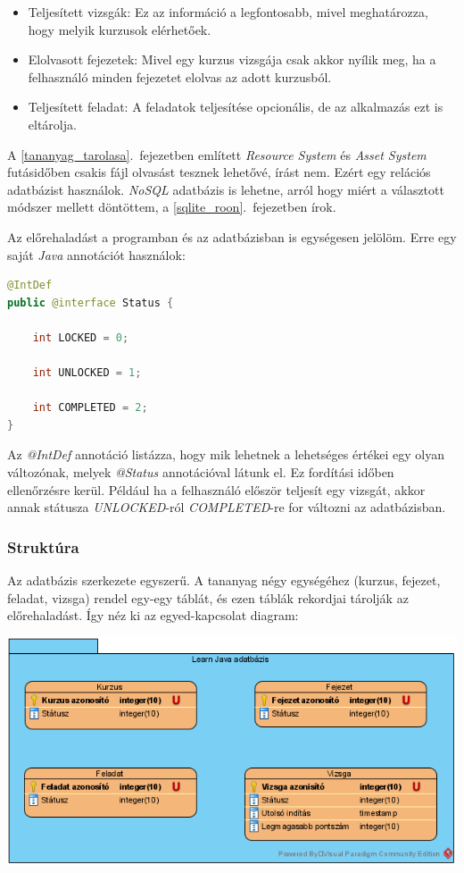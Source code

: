 \documentclass[12pt,a4paper]{article}
\begin{document}
	\begin{itemize}
		\item Teljesített vizsgák: Ez az információ a legfontosabb, mivel meghatározza, hogy melyik kurzusok elérhetőek.
		\item Elolvasott fejezetek: Mivel egy kurzus vizsgája csak akkor nyílik meg, ha a felhasználó minden fejezetet elolvas az adott kurzusból.
		\item Teljesített feladat: A feladatok teljesítése opcionális, de az alkalmazás ezt is eltárolja.
	\end{itemize}
	
	A \ref{tananyag_tarolasa}.\ fejezetben említett \textit{Resource System} és \textit{Asset System} futásidőben csakis fájl olvasást tesznek lehetővé, írást nem. Ezért egy relációs adatbázist használok. \textit{NoSQL} adatbázis is lehetne, arról hogy miért a választott módszer mellett döntöttem, a \ref{sqlite_roon}.\ fejezetben írok.
	
	Az előrehaladást a programban és az adatbázisban is egységesen jelölöm. Erre egy saját \textit{Java} annotációt használok:
	
	\begin{lstlisting}[language=Java]
@IntDef
public @interface Status {

	int LOCKED = 0;
		
	int UNLOCKED = 1;
		
	int COMPLETED = 2;
}
	\end{lstlisting}
	
	Az \textit{@IntDef} annotáció listázza, hogy mik lehetnek a lehetséges értékei egy olyan változónak, melyek \textit{@Status} annotációval látunk el. Ez fordítási időben ellenőrzésre kerül. Például ha a felhasználó először teljesít egy vizsgát, akkor annak státusza \textit{UNLOCKED}-ról \textit{COMPLETED}-re for változni az adatbázisban.
	 
	\subsubsection{Struktúra}\label{adatbazis_struktura}
	 
	Az adatbázis szerkezete egyszerű. A tananyag négy egységéhez (kurzus, fejezet, feladat, vizsga) rendel egy-egy táblát, és ezen táblák rekordjai tárolják az előrehaladást. Így néz ki az egyed-kapcsolat diagram:
	
	\begin{center}
		\includegraphics[width=\linewidth]{db_model}
	\end{center}
	
\end{document}
